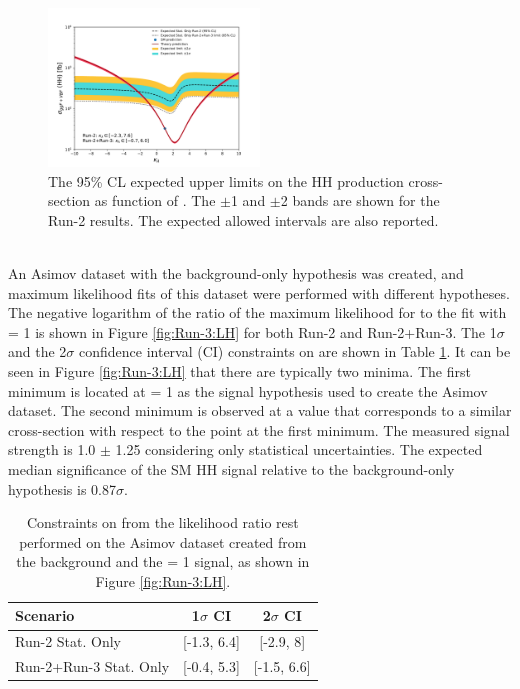\begin{figure}[htbp]
    \centering
    \includegraphics[width=0.5\textwidth]{Ch6/Img/kappa_lambda_Run_2_Run_3_stat.pdf}
     \begin{tcolorbox}[colback=black!5!white, colframe=white!75!black]
    \caption{The 95\% CL expected upper limits on the HH production cross-section as function of \kl. The $\pm$1 and $\pm$2 bands are shown for the Run-2 results. The expected allowed \kl intervals are also reported.}
    \label{fig:Run-3:Limit}
    \end{tcolorbox}
\end{figure}
\\
An Asimov dataset with the background-only hypothesis was created, and maximum likelihood fits of this dataset were performed with different \kl hypotheses. The negative logarithm of the ratio of the maximum likelihood for \kl to the fit with \kl= 1 is shown in Figure \ref{fig:Run-3:LH} for both Run-2 and Run-2+Run-3. The 1$\sigma$ and the 2$\sigma$ confidence interval (CI) constraints on \kl are shown in Table \ref{tab:Run-3:kl}. It can be seen in Figure \ref{fig:Run-3:LH} that there are typically two minima. The first minimum is located at \kl= 1 as the signal hypothesis used to create the Asimov dataset. The second minimum is observed at a \kl value that corresponds to a similar cross-section with respect to the \kl point at the first minimum. The measured signal strength is 1.0 $\pm$ 1.25 considering only statistical uncertainties. The expected median significance of the SM HH signal relative to the background-only hypothesis is 0.87$\sigma$. 

\begin{table}[htbp]
    \centering
    \begin{tabular}{lcc}
    \hline\hline 
        Scenario & 1$\sigma$ CI & 2$\sigma$ CI \\
    \hline    
        Run-2 Stat. Only & [-1.3, 6.4]  & [-2.9, 8] \\
        Run-2+Run-3 Stat. Only & [-0.4, 5.3] & [-1.5, 6.6] \\
    \hline\hline 
    \end{tabular}
    \begin{tcolorbox}[colback=black!5!white, colframe=white!75!black]
    \caption{Constraints on \kl from the likelihood ratio rest performed on the Asimov dataset created from the background and the \kl= 1 signal, as shown in Figure \ref{fig:Run-3:LH}.}
    \label{tab:Run-3:kl}
    \end{tcolorbox}
\end{table}

